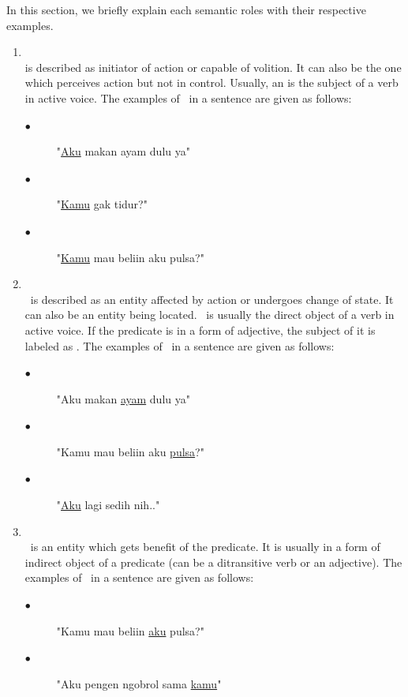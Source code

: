 In this section, we briefly explain each semantic roles with their respective examples.
\begin{enumerate}
	\item \agent\\
	\agent is described as initiator of action or capable of volition. It can also be the one which perceives action but not in control. Usually, an \agent is the subject of a verb in active voice.
	The examples of \agent~in a sentence are given as follows:
	\begin{description}
		\item[$\bullet$] "\underline{Aku} makan ayam dulu ya"
		\item[$\bullet$] "\underline{Kamu} gak tidur?"
		\item[$\bullet$] "\underline{Kamu} mau beliin aku pulsa?"
	\end{description}
	
	\item \patient\\
	\patient~is described as an entity affected by action or undergoes change of state. It can also be an entity being located. \patient~is usually the direct object of a verb in active voice. If the predicate is in a form of adjective, the subject of it is labeled as \patient. The examples of \patient~in a sentence are given as follows:
	\begin{description}
		\item[$\bullet$] "Aku makan \underline{ayam} dulu ya"
		\item[$\bullet$] "Kamu mau beliin aku \underline{pulsa}?"
		\item[$\bullet$] "\underline{Aku} lagi sedih nih.."
	\end{description}

	\item \beneficiary\\
	\beneficiary~is an entity which gets benefit of the predicate. It is usually in a form of indirect object of a predicate (can be a ditransitive verb or an adjective). The examples of \beneficiary~in a sentence are given as follows:
	\begin{description}
		\item[$\bullet$] "Kamu mau beliin \underline{aku} pulsa?"
		\item[$\bullet$] "Aku pengen ngobrol sama \underline{kamu}"
	\end{description}
	

\end{enumerate}
